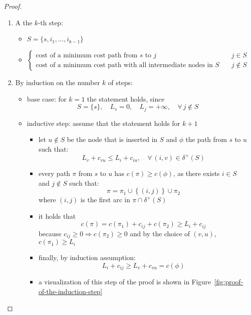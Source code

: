 \documentclass[english]{article}
\begin{document}
\begin{proof}
  \hfill
  \begin{enumerate}
    \item A the \(k\)-th step:
          \begin{itemize}
            \item \(S = \{s, i_1, \ldots, i_{k-1}\}\)
            \item \(\begin{cases}\text{cost of a minimum cost path from } s \text{ to } j & j \in S \\ \text{cost of a minimum cost path with all intermediate nodes in } S \quad & j \notin S\end{cases}\)
          \end{itemize}
    \item By induction on the number \(k\) of steps:
          \begin{itemize}
            \item base case: for \(k = 1\) the statement holds, since
                  \[S = \{s\}, \quad L_s = 0, \quad L_j = +\infty, \quad \forall \, j \notin S \]
            \item inductive step: assume that the statement holds for \(k+1\)
                  \begin{itemize}
                    \item let \(u \notin S\) be the node that is inserted in \(S\) and \(\phi\) the path from \(s\) to \(u\) such that:
                          \[ L_v + c_{vu} \leq L_i + c_{iu}, \quad \forall \, (i, v) \in \delta^+(S) \]
                    \item every path \(\pi\) from \(s\) to \(u\) has \(c(\pi) \geq c(\phi)\), as there exists \(i \in S\) and \(j \notin S\) such that:
                          \[ \pi = \pi_1 \cup \left\{ \left( i, j \right)  \right\} \cup \pi_2 \]
                          where \((i, j)\) is the first arc in \(\pi \cap \delta^+(S)\)
                    \item it holds that
                          \[ c(\pi) = c(\pi_1) + c_{ij} + c(\pi_2) \geq L_i + c_{ij} \]
                          because \(c_{ij} \geq 0 \Rightarrow c(\pi_2) \geq 0\) and by the choice of \((v, u)\), \(c(\pi_1) \geq L_i\)
                    \item finally, by induction assumption:
                          \[ L_i + c_{ij} \geq L_v + c_{vu} = c(\phi) \]
                    \item a visualization of this step of the proof is shown in Figure~\ref{fig:proof-of-the-induction-step}
                  \end{itemize}
          \end{itemize}
  \end{enumerate}
\end{proof}
\end{document}
